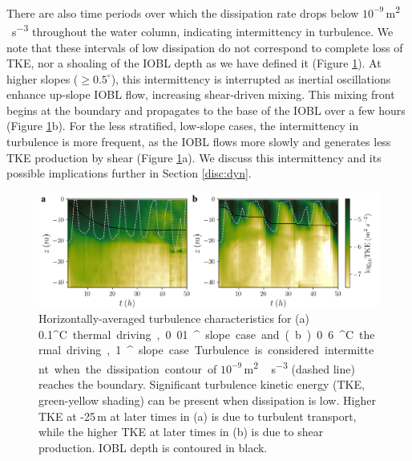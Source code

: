 \documentclass[tc, manuscript]{copernicus}
\begin{document}
There are also time periods over which the dissipation rate drops below $10^{-9}$\,\unit{m^2\,s^{-3}} throughout the water column, indicating intermittency in turbulence. We note that these intervals of low dissipation do not correspond to complete loss of TKE, nor a shoaling of the IOBL depth as we have defined it (Figure \ref{fig:intermittency}). At higher slopes ($\geq 0.5^{\circ}$), this intermittency is interrupted as inertial oscillations enhance up-slope IOBL flow, increasing shear-driven mixing. This mixing front begins at the boundary and propagates to the base of the IOBL over a few hours (Figure \ref{fig:intermittency}b). For the less stratified, low-slope cases, the intermittency in turbulence is more frequent, as the IOBL flows more slowly and generates less TKE production by shear (Figure \ref{fig:intermittency}a). We discuss this intermittency and its possible implications further in Section \ref{disc:dyn}.

\begin{figure}[t]
\includegraphics[width=12cm]{fig6.pdf}
\caption{Horizontally-averaged turbulence characteristics for (a) 0.1\unit{^{\circ}C} thermal driving, 0.01\unit{^{\circ}} slope case and (b) 0.6\unit{^{\circ}C} thermal driving, 1\unit{^{\circ}} slope case. Turbulence is considered intermittent when the dissipation contour of $10^{-9}$\,\unit{m^2\,s^{-3}} (dashed line) reaches the boundary. Significant turbulence kinetic energy (TKE, green-yellow shading) can be present when dissipation is low. Higher TKE at -25\,\unit{m} at later times in (a) is due to turbulent transport, while the higher TKE at later times in (b) is due to shear production. IOBL depth is contoured in black. }
\label{fig:intermittency}
\end{figure}
\end{document}
